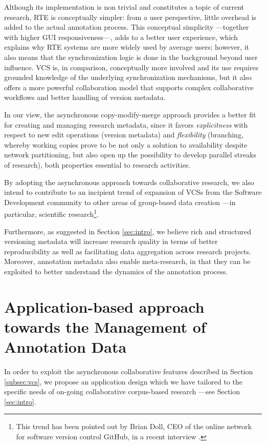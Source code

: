 \documentclass{sig-alternate}
\begin{document}
Although its implementation is non trivial and constitutes a topic of current research, RTE is
conceptually simpler: from a user perspective, little overhead is added to the actual annotation
process. This conceptual simplicity ---together with higher GUI responsiveness---, adds to
a better user experience, which explains why RTE systems are more widely used by average users;
however, it also means that the synchronization logic is done in the background beyond user
influence.
VCS is, in comparison, conceptually more involved and its use requires grounded knowledge of the
underlying synchronization mechanisms, but it also offers a more powerful collaboration model that
supports complex collaborative workflows and better handling of version metadata.

In our view, the asynchronous copy-modify-merge approach provides a
better fit for creating and managing research metadata, since it favors \textit{explicitness} with
respect to new edit operations (version metadata) and \textit{flexibility} (branching, whereby
working copies prove to be not only a solution to availability despite network
partitioning, but also open up the possibility to develop parallel streaks of research),
both properties essential to research activities.

By adopting the asynchronous approach towards collaborative research, we also intend to
contribute to an incipient trend of expansion of VCSs from the Software Development community
to other areas of group-based data creation ---in particular, scientific research\footnote{
  This trend has been pointed out by Brian Doll, CEO of the online network for software version
  control GitHub, in a recent interview \cite{Begel2013}.
}.

Furthermore, as suggested in Section \ref{sec:intro}, we believe rich and structured versioning
metadata will increase research quality in terms of better reproducibility as well as facilitating
data aggregation across research projects. Moreover, annotation metadata also enable meta-research,
in that they can be exploited to better understand the dynamics of the annotation process.

\section{Application-based approach towards the Management of Annotation Data}\label{sec:case}

In order to exploit the asynchronous collaborative features described in Section
\ref{subsec:vcs}, we propose an application design which we have tailored to the specific needs
of on-going collaborative corpus-based research ---see Section \ref{sec:intro}.
\end{document}
